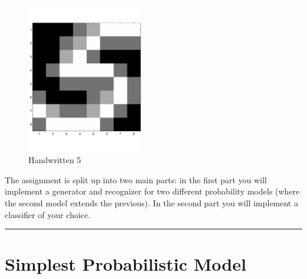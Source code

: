 \documentclass[12pt]{article}
\begin{document}
\hspace*{1.5cm}

\begin{figure}[bt]
\centering
\caption{Handwritten 5}
\label{fig:five}
\includegraphics[width=2in]{images/five.pdf}
\end{figure}

The assignment is split up into two main parts: in the first part
you will implement a generator and recognizer for two different
probability models (where the second model extends the previous).
In the second part you will implement a classifier of your choice.

\newpage

\hrule

\section{Simplest Probabilistic Model}
\label{sec:prob1}
\end{document}
